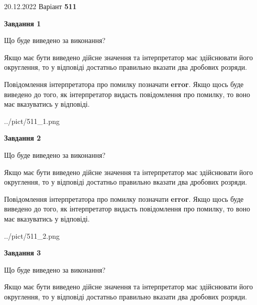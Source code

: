 \documentclass[12pt, ukrainian]{article}
\begin{document}
{20.12.2022 Варіант \No \textbf { 511 }\par}
{
\begin {Large}

{\begin {center}\textbf{Завдання 1}\end {center}}\par
Що буде виведено за виконання? \par

Якщо має бути виведено дійсне значення та інтерпретатор має здійснювати його округлення, 
то у відповіді достатньо правильно вказати два дробових розряди.

Повідомлення інтерпретатора про помилку позначати \textbf{error}.
Якщо щось буде виведено до того, як інтерпретатор видасть повідомлення про помилку, 
то воно має вказуватись у відповіді. \par

\begin{center}
	{../pict/511_1.png}
\end{center}
\newpage

{\begin {center}\textbf{Завдання 2}\end {center}}\par
Що буде виведено за виконання? \par

Якщо має бути виведено дійсне значення та інтерпретатор має здійснювати його округлення, 
то у відповіді достатньо правильно вказати два дробових розряди.

Повідомлення інтерпретатора про помилку позначати \textbf{error}.
Якщо щось буде виведено до того, як інтерпретатор видасть повідомлення про помилку, 
то воно має вказуватись у відповіді. \par

\begin{center}
	{../pict/511_2.png}
\end{center}
\newpage

{\begin {center}\textbf{Завдання 3}\end {center}}\par
Що буде виведено за виконання? \par

Якщо має бути виведено дійсне значення та інтерпретатор має здійснювати його округлення, 
то у відповіді достатньо правильно вказати два дробових розряди.


\end{Large}}
\end{document}

